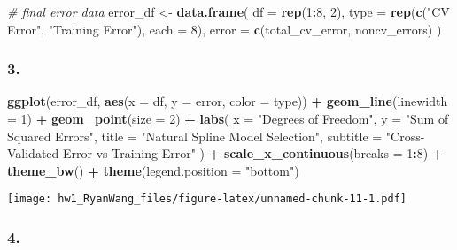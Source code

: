 \documentclass[
]{article}
\newenvironment{Shaded}{\begin{snugshade}}{\end{snugshade}}
\newcommand{\AttributeTok}[1]{\textcolor[rgb]{0.13,0.29,0.53}{#1}}
\newcommand{\CommentTok}[1]{\textcolor[rgb]{0.56,0.35,0.01}{\textit{#1}}}
\newcommand{\DecValTok}[1]{\textcolor[rgb]{0.00,0.00,0.81}{#1}}
\newcommand{\FunctionTok}[1]{\textcolor[rgb]{0.13,0.29,0.53}{\textbf{#1}}}
\newcommand{\NormalTok}[1]{#1}
\newcommand{\OtherTok}[1]{\textcolor[rgb]{0.56,0.35,0.01}{#1}}
\newcommand{\SpecialCharTok}[1]{\textcolor[rgb]{0.81,0.36,0.00}{\textbf{#1}}}
\newcommand{\StringTok}[1]{\textcolor[rgb]{0.31,0.60,0.02}{#1}}
\begin{document}
\begin{Shaded}
\begin{Highlighting}[]
\CommentTok{\# final error data}
\NormalTok{error\_df }\OtherTok{\textless{}{-}} \FunctionTok{data.frame}\NormalTok{(}
  \AttributeTok{df =} \FunctionTok{rep}\NormalTok{(}\DecValTok{1}\SpecialCharTok{:}\DecValTok{8}\NormalTok{, }\DecValTok{2}\NormalTok{),}
  \AttributeTok{type =} \FunctionTok{rep}\NormalTok{(}\FunctionTok{c}\NormalTok{(}\StringTok{"CV Error"}\NormalTok{, }\StringTok{"Training Error"}\NormalTok{), }\AttributeTok{each =} \DecValTok{8}\NormalTok{),}
  \AttributeTok{error =} \FunctionTok{c}\NormalTok{(total\_cv\_error, noncv\_errors)}
\NormalTok{)}
\end{Highlighting}
\end{Shaded}

\subsubsection{3.}\label{section-8}

\begin{Shaded}
\begin{Highlighting}[]
\FunctionTok{ggplot}\NormalTok{(error\_df, }\FunctionTok{aes}\NormalTok{(}\AttributeTok{x =}\NormalTok{ df, }\AttributeTok{y =}\NormalTok{ error, }\AttributeTok{color =}\NormalTok{ type)) }\SpecialCharTok{+}
  \FunctionTok{geom\_line}\NormalTok{(}\AttributeTok{linewidth =} \DecValTok{1}\NormalTok{) }\SpecialCharTok{+}
  \FunctionTok{geom\_point}\NormalTok{(}\AttributeTok{size =} \DecValTok{2}\NormalTok{) }\SpecialCharTok{+}
  \FunctionTok{labs}\NormalTok{(}
    \AttributeTok{x =} \StringTok{"Degrees of Freedom"}\NormalTok{,}
    \AttributeTok{y =} \StringTok{"Sum of Squared Errors"}\NormalTok{,}
    \AttributeTok{title =} \StringTok{"Natural Spline Model Selection"}\NormalTok{,}
    \AttributeTok{subtitle =} \StringTok{"Cross{-}Validated Error vs Training Error"}
\NormalTok{  ) }\SpecialCharTok{+}
  \FunctionTok{scale\_x\_continuous}\NormalTok{(}\AttributeTok{breaks =} \DecValTok{1}\SpecialCharTok{:}\DecValTok{8}\NormalTok{) }\SpecialCharTok{+}
  \FunctionTok{theme\_bw}\NormalTok{() }\SpecialCharTok{+}
  \FunctionTok{theme}\NormalTok{(}\AttributeTok{legend.position =} \StringTok{"bottom"}\NormalTok{)}
\end{Highlighting}
\end{Shaded}

\texttt{[image: hw1\_RyanWang\_files/figure-latex/unnamed-chunk-11-1.pdf]}

\subsubsection{4.}\label{section-9}
\end{document}
